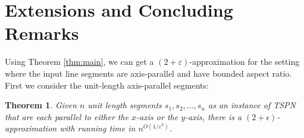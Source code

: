 \documentclass[pdflatex,sn-mathphys-num]{sn-jnl}
\theoremstyle{thmstyleone}
\newtheorem{theorem}{Theorem}
\newcommand{\eps}{\varepsilon}
\begin{document}
\section{Extensions and Concluding Remarks}\label{sec:conclusion}

Using Theorem \ref{thm:main}, we can get a $(2+\eps)$-approximation for the setting where the input line segments are axis-parallel and have bounded aspect ratio. First we consider the unit-length axis-parallel segments:

\begin{theorem}
    Given $n$ unit length segments $s_1, s_2,\dots, s_n$ as an instance of TSPN that are each parallel to either the $x$-axis or the $y$-axis, there is a $(2+\epsilon)$-approximation with running time in $n^{O(1/\eps^3)}$.
\end{theorem}
\end{document}
